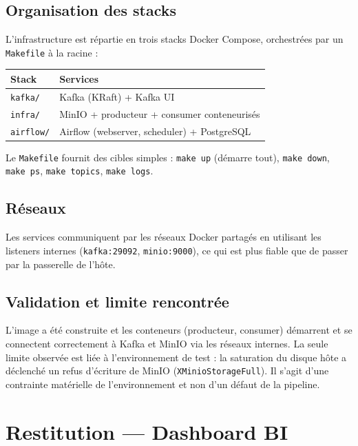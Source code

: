 \documentclass[11pt,a4paper]{article}
\newcommand{\code}[1]{\texttt{\small #1}}
\begin{document}
\subsection{Organisation des stacks}

L'infrastructure est répartie en trois stacks Docker Compose, orchestrées par un
\code{Makefile} à la racine :

\begin{center}
\renewcommand{\arraystretch}{1.25}
\begin{tabularx}{\linewidth}{@{}lX@{}}
\toprule
\textbf{Stack} & \textbf{Services} \\
\midrule
\code{kafka/}   & Kafka (KRaft) + Kafka UI \\
\code{infra/}   & MinIO + producteur + consumer conteneurisés \\
\code{airflow/} & Airflow (webserver, scheduler) + PostgreSQL \\
\bottomrule
\end{tabularx}
\end{center}

Le \code{Makefile} fournit des cibles simples : \code{make up} (démarre tout),
\code{make down}, \code{make ps}, \code{make topics}, \code{make logs}.

\subsection{Réseaux}

Les services communiquent par les réseaux Docker partagés en utilisant les
listeners internes (\code{kafka:29092}, \code{minio:9000}), ce qui est plus
fiable que de passer par la passerelle de l'hôte.

\subsection{Validation et limite rencontrée}

L'image a été construite et les conteneurs (producteur, consumer) démarrent et
se connectent correctement à Kafka et MinIO via les réseaux internes. La seule
limite observée est liée à l'environnement de test : la saturation du disque
hôte a déclenché un refus d'écriture de MinIO (\code{XMinioStorageFull}). Il
s'agit d'une contrainte matérielle de l'environnement et non d'un défaut de la
pipeline.

\section{Restitution — Dashboard BI}
\end{document}
